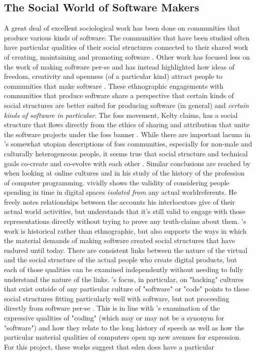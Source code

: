 \documentclass[a4paper,man,natbib]{apa6}
\begin{document}
  \subsection*{The Social World of Software Makers}
   A great deal of excellent sociological work has been done on communities that produce various kinds of software. The communities that have been studied often have particular qualities of their social structures connected to their shared work of creating, maintaining and promoting software \citep{Kelty2008-jm}. Other work has focused less on the work of making software per-se and has instead highlighted how ideas of freedom, creativity and openness (of a particular kind) attract people to communities that make software \citep{Gabriella_Coleman2012-lq}. These ethnographic engagements with communities that produce software share a perspective that certain kinds of social structures are better suited for producing software (in general) and \textit{certain kinds of software in particular}. The \acrshort{foss} movement, Kelty claims, has a social structure that flows directly from the ethics of sharing and attribution that unite the software projects under the \acrshort{foss} banner \citep{Kelty2008-jm}. While there are important lacuna in \citet{Kelty2008-jm}'s somewhat utopian descriptions of \acrshort{foss} communities, especially for non-male and culturally heterogeneous people, it seems true that social structure and technical goals co-create and co-evolve with each other \citep{Penny2013-ic, Dean2010-lk}. Similar conclusions are reached by \citet{Boellstorff2015-al} when looking at online cultures and \citet{Ensmenger2012-kz} in his study of the history of the profession of computer programming. \citet{Boellstorff2015-al} vividly shows the validity of considering people spending in time in digital spaces \textit{isolated from} any actual world\footnotemark referents. He freely notes relationships between the accounts his interlocutors give of their actual world activities, but understands that it's still valid to engage with those representations directly without trying to prove any truth-claims about them. \citet{Ensmenger2012-kz}'s work is historical rather than ethnographic, but also supports the ways in which the material demands of making software created social structures that have endured until today. There are consistent links between the nature of the virtual and the social structure of the actual people who create digital products, but each of those qualities can be examined independently without needing to fully understand the nature of the links. \citet{Gabriella_Coleman2012-lq}'s focus, in particular, on "hacking" cultures that exist outside of any particular culture of "software" or "code" points to these social structures fitting particularly well with software, but not proceeding directly from software per-se \citep{Drexler2019-ja}. This is in line with \citet{Cox2013-zo}'s examination of the expressive qualities of "coding" (which may or may not be a synonym for "software") and how they relate to the long history of speech as well as how the particular material qualities of computers open up new avenues for expression. For this project, these works suggest that \acrshort{eden} does have a particular 
\end{document}
